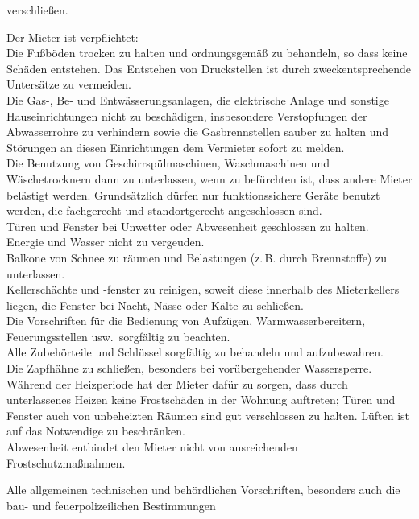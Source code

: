 \documentclass{scrreprt}[12pt,a4paper,twoside,duplex]
\begin{document}
\begin{contract}
\begin{multicols}{2}
\begin{description}[style=unboxed,leftmargin=0cm]
    verschließen.
    \item[Sorgfaltspflicht des Mieters] Der Mieter ist verpflichtet:\\
    Die Fußböden trocken zu halten und ordnungsgemäß zu behandeln, so dass keine
    Schäden entstehen. Das Entstehen von Druckstellen ist durch
    zweckentsprechende Untersätze zu vermeiden.\\
    Die Gas-, Be- und Entwässerungsanlagen, die elektrische Anlage und sonstige
    Hauseinrichtungen nicht zu beschädigen, insbesondere Verstopfungen der
    Abwasserrohre zu verhindern sowie die Gasbrennstellen sauber zu halten und
    Störungen an diesen Einrichtungen dem Vermieter sofort zu melden.\\
    Die Benutzung von Geschirrspülmaschinen, Waschmaschinen und Wäschetrocknern
    dann zu unterlassen, wenn zu befürchten ist, dass andere Mieter belästigt
    werden. Grundsätzlich dürfen nur funktionssichere Geräte benutzt werden, die
    fachgerecht und standortgerecht angeschlossen sind.\\
    Türen und Fenster bei Unwetter oder Abwesenheit geschlossen zu halten.\\
    Energie und Wasser nicht zu vergeuden.\\
    Balkone von Schnee zu räumen und Belastungen (z.\,B. durch Brennstoffe) zu
    unterlassen.\\
    Kellerschächte und -fenster zu reinigen, soweit diese innerhalb des
    Mieterkellers liegen, die Fenster bei Nacht, Nässe oder Kälte zu
    schließen.\\
    Die Vorschriften für die Bedienung von Aufzügen, Warmwasserbereitern,
    Feuerungsstellen usw.\ sorgfältig zu beachten.\\
    Alle Zubehörteile und Schlüssel sorgfältig zu behandeln und aufzubewahren.\\
    Die Zapfhähne zu schließen, besonders bei vorübergehender Wassersperre.\\
    Während der Heizperiode hat der Mieter dafür zu sorgen, dass durch
    unterlassenes Heizen keine Frostschäden in der Wohnung auftreten; Türen und
    Fenster auch von unbeheizten Räumen sind gut verschlossen zu halten. Lüften
    ist auf das Notwendige zu beschränken.\\
    Abwesenheit entbindet den Mieter nicht von ausreichenden
    Frostschutzmaßnahmen.\\
    \item[Brandschutzbestimmungen] Alle allgemeinen technischen und behördlichen
    Vorschriften, besonders auch die bau- und feuerpolizeilichen Bestimmungen

\end{description}
\end{multicols}
\end{contract}
\end{document}
